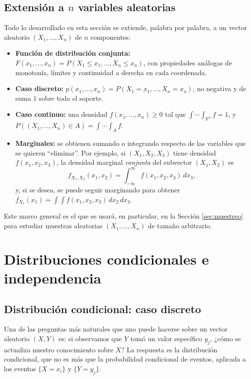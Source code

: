 \documentclass[11pt,a4paper]{article}
\theoremstyle{plain}
\theoremstyle{definition}
\theoremstyle{remark}
\begin{document}
\subsection{Extensión a $n$ variables aleatorias}\label{sec:extension-n}

Todo lo desarrollado en esta sección se extiende, palabra por palabra, a un vector aleatorio $(X_1,\dots,X_n)$ de $n$ componentes:

\begin{itemize}
\item \textbf{Función de distribución conjunta:} $F(x_1,\dots,x_n) = P(X_1\le x_1,\dots,X_n\le x_n)$, con propiedades análogas de monotonía, límites y continuidad a derecha en cada coordenada.
\item \textbf{Caso discreto:} $p(x_1,\dots,x_n) = P(X_1=x_1,\dots,X_n=x_n)$, no negativa y de suma $1$ sobre todo el soporte.
\item \textbf{Caso continuo:} una densidad $f(x_1,\dots,x_n)\ge0$ tal que $\displaystyle\int\cdots\int_{\mathbb R^n} f = 1$, y $P((X_1,\dots,X_n)\in A) = \int\cdots\int_A f$.
\item \textbf{Marginales:} se obtienen sumando o integrando respecto de las variables que se quieren ``eliminar''. Por ejemplo, si $(X_1,X_2,X_3)$ tiene densidad $f(x_1,x_2,x_3)$, la densidad marginal \emph{conjunta} del subvector $(X_1,X_2)$ es
\[
f_{X_1,X_2}(x_1,x_2) = \int_{-\infty}^{\infty} f(x_1,x_2,x_3)\,dx_3,
\]
y, si se desea, se puede seguir marginando para obtener $f_{X_1}(x_1) = \int\int f(x_1,x_2,x_3)\,dx_2\,dx_3$.
\end{itemize}

Este marco general es el que se usará, en particular, en la Sección \ref{sec:muestreo} para estudiar muestras aleatorias $(X_1,\dots,X_n)$ de tamaño arbitrario.

\section{Distribuciones condicionales e independencia}\label{sec:condicionales}

\subsection{Distribución condicional: caso discreto}

Una de las preguntas más naturales que uno puede hacerse sobre un vector aleatorio $(X,Y)$ es: si observamos que $Y$ tomó un valor específico $y_j$, ¿cómo se actualiza nuestro conocimiento sobre $X$? La respuesta es la distribución condicional, que no es más que la probabilidad condicional de eventos, aplicada a los eventos $\{X=x_i\}$ y $\{Y=y_j\}$.
\end{document}
